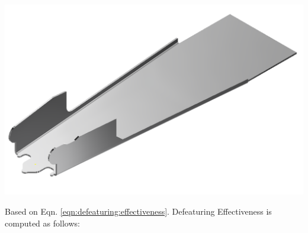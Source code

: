 
%
%


\begin{minipage}{\linewidth}
\begin{minipage}[c]{0.62\linewidth}
\includegraphics[width=\linewidth,valign=t]{../Common/images/StaplerLower_defeatured_model}
 \label{fig:results:staplerlowerdefeatmodel}


Based on Eqn. \ref{eqn:defeaturing:effectiveness}. Defeaturing Effectiveness is computed as follows:


\end{minipage}
\end{minipage}
